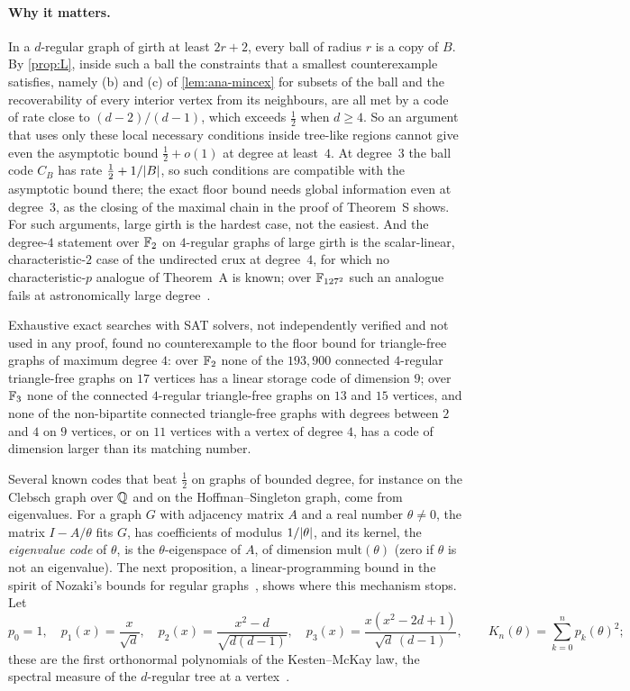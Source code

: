 \paragraph{Why it matters.} In a $d$-regular graph of girth at least $2r+2$, every ball of radius $r$ is a copy of $B$.
By \cref{prop:L}, inside such a ball the constraints that a smallest counterexample satisfies, namely (b) and (c) of
\cref{lem:ana-mincex} for subsets of the ball and the recoverability of every interior vertex from its neighbours, are
all met by a code of rate close to $(d-2)/(d-1)$, which exceeds $\frac12$ when $d\ge4$. So an argument that uses only
these local necessary conditions inside tree-like regions cannot give even the asymptotic bound $\frac12+o(1)$ at degree
at least~$4$. At degree~$3$ the ball code $C_B$ has rate $\frac12+1/\lvert B \rvert$, so such conditions are compatible with the
asymptotic bound there; the exact floor bound needs global information even at degree~$3$, as the closing of the maximal
chain in the proof of Theorem~S shows. For such arguments, large girth is the hardest case, not the easiest. And the
degree-$4$ statement over $\mathbb{F}_2$ on $4$-regular graphs of large girth is the scalar-linear, characteristic-$2$ case of the
undirected crux at degree~$4$, for which no characteristic-$p$ analogue of Theorem~A is known; over $\mathbb{F}_{127^2}$ such an
analogue fails at astronomically large degree~\cite[Corollary~U]{StorageCodes2026}.

\begin{remark}\label{rem:ana-deg4}
Exhaustive exact searches with SAT solvers, not independently verified and not used in any proof, found no
counterexample to the floor bound for triangle-free graphs of maximum degree $4$: over $\mathbb{F}_2$ none of the
$193{,}900$ connected $4$-regular triangle-free graphs on $17$ vertices has a linear storage code of dimension $9$; over
$\mathbb{F}_3$ none of the connected $4$-regular triangle-free graphs on $13$ and $15$ vertices, and none of the non-bipartite
connected triangle-free graphs with degrees between $2$ and $4$ on $9$ vertices, or on $11$ vertices with a vertex of
degree $4$, has a code of dimension larger than its matching number.
\end{remark}

Several known codes that beat $\frac12$ on graphs of bounded degree, for instance on the Clebsch graph over $\mathbb{Q}$ and on
the Hoffman--Singleton graph, come from eigenvalues. For a graph $G$ with adjacency matrix $A$ and a real number
$\theta\ne0$, the matrix $I-A/\theta$ fits $G$, has coefficients of modulus $1/\lvert \theta \rvert$, and its kernel, the \emph{eigenvalue code} of $\theta$, is the
$\theta$-eigenspace of $A$, of dimension $\mathrm{mult}(\theta)$ (zero if $\theta$ is not an eigenvalue). The next
proposition, a linear-programming bound in the spirit of Nozaki's bounds for regular graphs~\cite{Nozaki2015}, shows
where this mechanism stops. Let
\[
  p_0=1,\quad p_1(x)=\frac{x}{\sqrt d},\quad p_2(x)=\frac{x^2-d}{\sqrt{d(d-1)}},\quad
  p_3(x)=\frac{x(x^2-2d+1)}{\sqrt d\,(d-1)},\qquad K_n(\theta)=\sum_{k=0}^np_k(\theta)^2 ;
\]
these are the first orthonormal polynomials of the Kesten--McKay law, the spectral measure of the $d$-regular tree at a
vertex~\cite{Kesten1959,McKay1981}.


